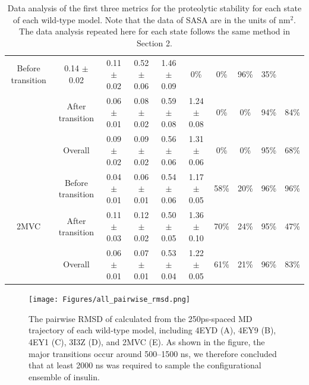 \documentclass[9pt]{elife}
\begin{document}
\begin{table}[H]
{\begin{tabular}{cc|cc|cc|cccc|}
  Before transition &
  \multicolumn{1}{c|}{0.14 $\pm$ 0.02} &
  0.11 $\pm$ 0.02 &
  \multicolumn{1}{c|}{0.52 $\pm$ 0.06} &
  1.46 $\pm$ 0.09 &
  \multicolumn{1}{c|}{0\%} &
  \multicolumn{1}{c|}{0\%} &
  \multicolumn{1}{c|}{96\%} &
  35\% \\ \cline{2-10} 
\multicolumn{1}{|c|}{} &
  After transition &
  \multicolumn{1}{c|}{0.06 $\pm$ 0.01} &
  0.08 $\pm$ 0.02 &
  \multicolumn{1}{c|}{0.59 $\pm$ 0.08} &
  1.24 $\pm$ 0.08 &
  \multicolumn{1}{c|}{0\%} &
  \multicolumn{1}{c|}{0\%} &
  \multicolumn{1}{c|}{94\%} &
  84\% \\ \cline{2-10} 
\multicolumn{1}{|c|}{} &
  Overall &
  \multicolumn{1}{c|}{0.09 $\pm$ 0.02} &
  0.09 $\pm$ 0.02 &
  \multicolumn{1}{c|}{0.56 $\pm$ 0.06} &
  1.31 $\pm$ 0.06 &
  \multicolumn{1}{c|}{0\%} &
  \multicolumn{1}{c|}{0\%} &
  \multicolumn{1}{c|}{95\%} &
  68\% \\ \hline
\multicolumn{1}{|c|}{\multirow{3}{*}{2MVC}} &
  Before transition &
  \multicolumn{1}{c|}{0.04 $\pm$ 0.01} &
  0.06 $\pm$ 0.01 &
  \multicolumn{1}{c|}{0.54 $\pm$ 0.06} &
  1.17 $\pm$ 0.05 &
  \multicolumn{1}{c|}{58\%} &
  \multicolumn{1}{c|}{20\%} &
  \multicolumn{1}{c|}{96\%} &
  96\% \\ \cline{2-10} 
\multicolumn{1}{|c|}{} &
  After transition &
  \multicolumn{1}{c|}{0.11 $\pm$ 0.03} &
  0.12 $\pm$ 0.02 &
  \multicolumn{1}{c|}{0.50 $\pm$ 0.05} &
  1.36 $\pm$ 0.10 &
  \multicolumn{1}{c|}{70\%} &
  \multicolumn{1}{c|}{24\%} &
  \multicolumn{1}{c|}{95\%} &
  47\% \\ \cline{2-10} 
\multicolumn{1}{|c|}{} &
  Overall &
  \multicolumn{1}{c|}{0.06 $\pm$ 0.01} &
  0.07 $\pm$ 0.01 &
  \multicolumn{1}{c|}{0.53 $\pm$ 0.04} &
  1.22 $\pm$ 0.05 &
  \multicolumn{1}{c|}{61\%} &
  \multicolumn{1}{c|}{21\%} &
  \multicolumn{1}{c|}{96\%} &
  83\% \\ \hline
\end{tabular}%
}
\caption{Data analysis of the first three metrics for the proteolytic stability for each state of each wild-type model. Note that the data of SASA are in the units of nm$^{2}$. The data analysis repeated here for each state follows the same method in Section 2.}
\label{ranges}
\end{table}

\renewcommand{\thefigure}{S\arabic{figure}}
\begin{figure}[H]
\centering
\texttt{[image: Figures/all\_pairwise\_rmsd.png]}
\caption{The pairwise RMSD of calculated from the 250ps-spaced MD trajectory of each wild-type model, including 4EYD (A), 4EY9 (B), 4EY1 (C), 3I3Z (D), and 2MVC (E). As shown in the figure, the major transitions occur around 500--1500 ns, we therefore concluded that at least 2000 ns was required to sample the configurational ensemble of insulin.}
\label{supple_fig: pairwise_rmsd}
\end{figure}
\end{document}
